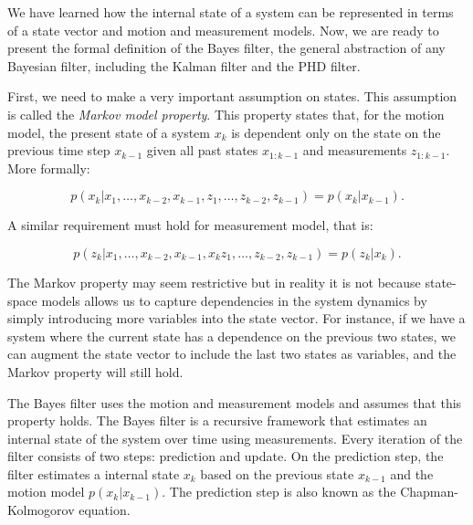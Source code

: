 We have learned how the internal state of a system can be represented in terms
of a state vector and motion and measurement models. Now, we are ready to 
present the formal definition of the Bayes filter, the general abstraction of
any Bayesian filter, including the Kalman filter and the PHD filter.

First, we need to make a very important assumption on states. This assumption
is called the \textit{Markov model property}. This property states that, for 
the motion model, the present state of a system $x_k$ is dependent only on 
the state on the previous time step $x_{k-1}$ given all past states $x_{1:k-1}$ 
and measurements $z_{1:k-1}$. More formally:

\begin{equation}
p(x_k | x_1, \ldots, x_{k-2}, x_{k-1},
        z_1, \ldots, z_{k-2}, z_{k-1}) 
    = p(x_k | x_{k-1}).
\end{equation}

A similar requirement must hold for measurement model, that is:

\begin{equation}
    p(z_k | x_1, \ldots, x_{k-2}, x_{k-1}, x_{k}
        z_1, \ldots, z_{k-2}, z_{k-1}) 
    = p(z_k | x_k).
\end{equation}

The Markov property may seem restrictive but in reality it is not because state-
space models allows us to capture dependencies in the system dynamics by simply 
introducing more variables into the state vector. For instance, if we have a 
system where the current state has a dependence on the previous two states, we 
can augment the state vector to include the last two states as variables, and 
the Markov property will still hold.

The Bayes filter uses the motion and measurement models and assumes that this
property holds. The Bayes filter is a recursive framework that estimates an
internal state of the system over time using measurements. Every iteration of
the filter consists of two steps: prediction and update. On the prediction step,
the filter estimates a internal state $x_k$ based on the previous state
$x_{k-1}$ and the motion model $p(x_k | x_{k-1})$. The prediction step
is also known as the Chapman-Kolmogorov equation.

